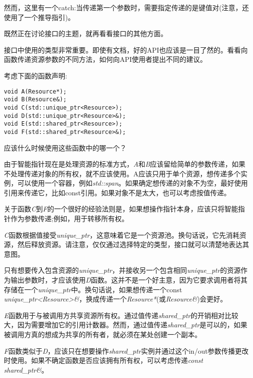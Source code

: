 然而，这里有一个catch:当传递第一个参数时，需要指定传递的是键值对(注意，还使用了一个推导指引)。

既然正在讨论接口的主题，就再看看接口的其他方面。


接口中使用的类型非常重要。即使有文档，好的API也应该是一目了然的。看看向函数传递资源参数的不同方法，如何向API使用者提出不同的建议。

考虑下面的函数声明:

\begin{lstlisting}[style=styleCXX]
void A(Resource*);
void B(Resource&);
void C(std::unique_ptr<Resource>);
void D(std::unique_ptr<Resource>&);
void E(std::shared_ptr<Resource>);
void F(std::shared_ptr<Resource>&);
\end{lstlisting}

应该什么时候使用这些函数中的哪一个？

由于智能指针现在是处理资源的标准方式，\textit{A}和\textit{B}应该留给简单的参数传递，如果不处理传递对象的所有权，就不应该使用。A应该只用于单个资源，想传递多个实例，可以使用一个容器，例如\textit{std::span}。如果确定想传递的对象不为空，最好使用引用来传递它，比如const引用。如果对象不是太大，也可以考虑按值传递。

关于函数\textit{C}到\textit{F}的一个很好的经验法则是，如果想操作指针本身，应该只将智能指针作为参数传递;例如，用于转移所有权。

\textit{C}函数根据值接受\textit{unique\_ptr}，这意味着它是一个资源池。换句话说，它先消耗资源，然后释放资源。请注意，仅仅通过选择特定的类型，接口就可以清楚地表达其意图。

只有想要传入包含资源的\textit{unique\_ptr}，并接收另一个包含相同\textit{unique\_ptr}的资源作为输出参数时，才应该使用\textit{D}函数。这并不是一个好主意，因为它要求调用者将其存储在一个\textit{unique\_ptr}中。换句话说，如果想传递一个const \textit{unique\_ptr<Resource>\&}，换成传递一个\textit{Resource*}(或\textit{Resource\&})会更好。

\textit{E}函数用于与被调用方共享资源所有权。通过值传递\textit{shared\_ptr}的开销相对比较大，因为需要增加它的引用计数器。然而，通过值传递\textit{shared\_ptr}是可以的，如果被调用方真的想成为共享的所有者，就必须在某处创建一个副本。

\textit{F}函数类似于\textit{D}，应该只在想要操作\textit{shared\_ptr}实例并通过这个in/out参数传播更改时使用。如果不确定函数是否应该拥有所有权，可以考虑传递\textit{const shared\_ptr\&}。

